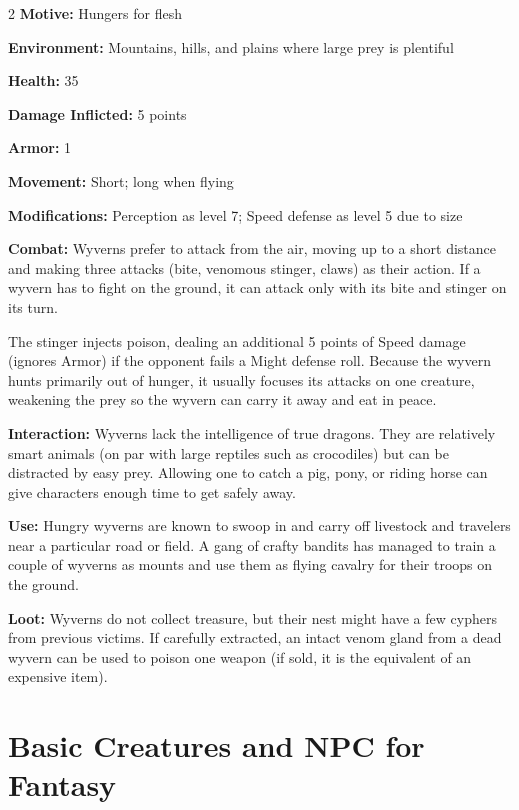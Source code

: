 \begin{multicols}{2}
\textbf{Motive:} Hungers for flesh 

\textbf{Environment:} Mountains, hills, and plains where large prey is plentiful 

\textbf{Health:} 35 

\textbf{Damage Inflicted:} 5 points 

\textbf{Armor:} 1 

\textbf{Movement:} Short; long when flying 

\textbf{Modifications:} Perception as level 7; Speed defense as level 5 due to size 

\textbf{Combat:} Wyverns prefer to attack from the air, moving up to a short distance and making three attacks (bite, venomous stinger, claws) as their action. If a wyvern has to fight on the ground, it can attack only with its bite and stinger on its turn. 

The stinger injects poison, dealing an additional 5 points of Speed damage (ignores Armor) if the opponent fails a Might defense roll. Because the wyvern hunts primarily out of hunger, it usually focuses its attacks on one creature, weakening the prey so the wyvern can carry it away and eat in peace. 

\textbf{Interaction:} Wyverns lack the intelligence of true dragons. They are relatively smart animals (on par with large reptiles such as crocodiles) but can be distracted by easy prey. Allowing one to catch a pig, pony, or riding horse can give characters enough time to get safely away. 

\textbf{Use:} Hungry wyverns are known to swoop in and carry off livestock and travelers near a particular road or field. A gang of crafty bandits has managed to train a couple of wyverns as mounts and use them as flying cavalry for their troops on the ground.

\textbf{Loot:} Wyverns do not collect treasure, but their nest might have a few cyphers from previous victims. If carefully extracted, an intact venom gland from a dead wyvern can be used to poison one weapon (if sold, it is the equivalent of an expensive item).

\section{Basic Creatures and NPC for Fantasy}

\begin{itemize}


\end{itemize}
\end{multicols}
